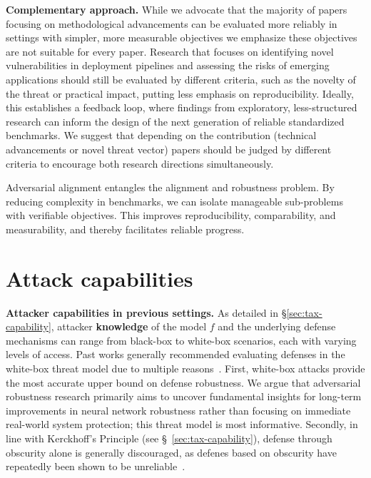 \textbf{Complementary approach.} While we advocate that the majority of papers focusing on methodological advancements can be evaluated more reliably in settings with simpler, more measurable objectives we emphasize these objectives are not suitable for every paper. Research that focuses on identifying novel vulnerabilities in deployment pipelines and assessing the risks of emerging applications should still be evaluated by different criteria, such as the novelty of the threat or practical impact, putting less emphasis on reproducibility. Ideally, this establishes a feedback loop, where findings from exploratory, less-structured research can inform the design of the next generation of reliable standardized benchmarks. We suggest that depending on the contribution (technical advancements or novel threat vector) papers should be judged by different criteria to encourage both research directions simultaneously.

\begin{tcolorbox}[
    colback=white, colframe=purple!80!black, coltitle=white, fonttitle=\bfseries, 
    rounded corners, enhanced, 
    title=Key Takeaways, 
    attach boxed title to top left={yshift=-2mm, xshift=5mm}, 
    boxed title style={colback=purple!80!black, rounded corners},
    boxsep=1mm,
    left=1mm, %
    right=1mm
]
Adversarial alignment entangles the alignment and robustness problem. By reducing complexity in benchmarks, we can isolate manageable sub-problems with verifiable objectives. This improves reproducibility, comparability, and measurability, and thereby facilitates reliable progress.
\end{tcolorbox}

\vspace{-10pt}
\section{Attack capabilities}\label{sec:pos-capability}

\textbf{Attacker capabilities in previous settings.}
As detailed in \S\ref{sec:tax-capability}, attacker \textbf{knowledge} of the model $f$ and the underlying defense mechanisms can range from black-box to white-box scenarios, each with varying levels of access. Past works generally recommended evaluating defenses in the white-box threat model due to multiple reasons~\cite{athalye_obfuscated_2018}. %
First, white-box attacks provide the most accurate upper bound on defense robustness. We argue that adversarial robustness research primarily aims to uncover fundamental insights for long-term improvements in neural network robustness rather than focusing on immediate real-world system protection; this threat model is most informative. Secondly, in line with Kerckhoff’s Principle (see \S~\ref{sec:tax-capability}), defense through obscurity alone is generally discouraged, as defenes based on obscurity have repeatedly been shown to be unreliable~\cite{athalye_obfuscated_2018}.

